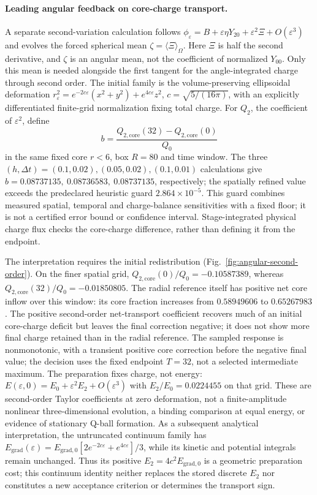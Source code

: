 \paragraph{Leading angular feedback on core-charge transport.}
A separate second-variation calculation follows
$\phi_\varepsilon=B+\varepsilon\eta Y_{20}+\varepsilon^2\Xi+O(\varepsilon^3)$
and evolves the forced spherical mean $\zeta=\langle\Xi\rangle_\Omega$.
Here $\Xi$ is half the second derivative, and $\zeta$ is an angular mean,
not the coefficient of normalized $Y_{00}$. Only this mean is needed
alongside the first tangent for the angle-integrated charge through
second order. The initial family is the volume-preserving ellipsoidal
deformation $r_\varepsilon^2=e^{-2c\varepsilon}(x^2+y^2)+e^{4c\varepsilon}z^2$,
$c=\sqrt{5/(16\pi)}$, with an explicitly differentiated finite-grid
normalization fixing total charge. For $Q_2$, the coefficient of
$\varepsilon^2$, define
\[
 b=\frac{Q_{2,\mathrm{core}}(32)-Q_{2,\mathrm{core}}(0)}{Q_0}
\]
in the same fixed core $r<6$, box $R=80$ and time window.
The three $(h,\Delta t)=(0.1,0.02),(0.05,0.02),(0.1,0.01)$ calculations
give $b=0.08737135,\ 0.08736583,\ 0.08737135$, respectively;
the spatially refined value exceeds the predeclared heuristic guard
$2.864\times10^{-5}$. This guard combines measured spatial, temporal and
charge-balance sensitivities with a fixed floor; it is not a certified
error bound or confidence interval. Stage-integrated physical charge flux
checks the core-charge difference, rather than defining it from the endpoint.

The interpretation requires the initial redistribution
(Fig.~\ref{fig:angular-second-order}). On the finer spatial grid,
$Q_{2,\mathrm{core}}(0)/Q_0=-0.10587389$, whereas
$Q_{2,\mathrm{core}}(32)/Q_0=-0.01850805$.
The radial reference itself has positive net core inflow over this window:
its core fraction increases from $0.58949606$ to $0.65267983$.
The positive second-order net-transport coefficient recovers much of an
initial core-charge deficit but leaves the final correction negative;
it does not show more final charge retained than in the radial reference.
The sampled response is nonmonotonic, with a transient positive core
correction before the negative final value; the decision uses the fixed
endpoint $T=32$, not a selected intermediate maximum.
The preparation fixes charge, not energy:
$E(\varepsilon,0)=E_0+\varepsilon^2 E_2+O(\varepsilon^3)$ with
$E_2/E_0=0.0224455$ on that grid. These are second-order Taylor coefficients at zero deformation,
not a finite-amplitude nonlinear three-dimensional evolution, a binding
comparison at equal energy, or evidence of stationary Q-ball formation.
As a subsequent analytical interpretation, the untruncated continuum
family has $E_{\mathrm{grad}}(\varepsilon)=
E_{\mathrm{grad},0}[2e^{-2c\varepsilon}+e^{4c\varepsilon}]/3$,
while its kinetic and potential integrals remain unchanged. Thus its
positive $E_2=4c^2E_{\mathrm{grad},0}$ is a geometric preparation cost;
this continuum identity neither replaces the stored discrete $E_2$ nor
constitutes a new acceptance criterion or determines the transport sign.

